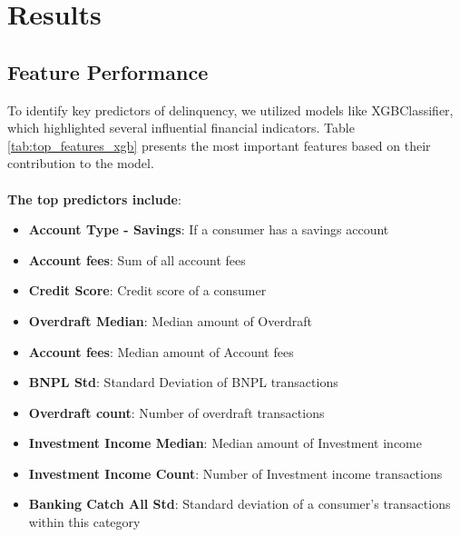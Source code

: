 \documentclass[12pt,letterpaper]{article}
\begin{document}
\section{Results}

\subsection{Feature Performance}
To identify key predictors of delinquency, we utilized models like XGBClassifier, which highlighted several influential financial indicators. Table \ref{tab:top_features_xgb} presents the most important features based on their contribution to the model. \\
\\
\textbf{The top predictors include}: \\

\begin{itemize}
    \item \textbf{Account Type - Savings}: If a consumer has a savings account
    \item \textbf{Account fees}: Sum of all account fees
    \item \textbf{Credit Score}: Credit score of a consumer
    \item \textbf{Overdraft Median}: Median amount of Overdraft
    \item \textbf{Account fees}: Median amount of Account fees
    \item \textbf{BNPL Std}: Standard Deviation of BNPL transactions
    \item \textbf{Overdraft count}: Number of overdraft transactions
    \item \textbf{Investment Income Median}: Median amount of Investment income
    \item \textbf{Investment Income Count}: Number of Investment income transactions
    \item \textbf{Banking Catch All Std}: Standard deviation of a consumer's transactions within this category
\end{itemize}
\end{document}
